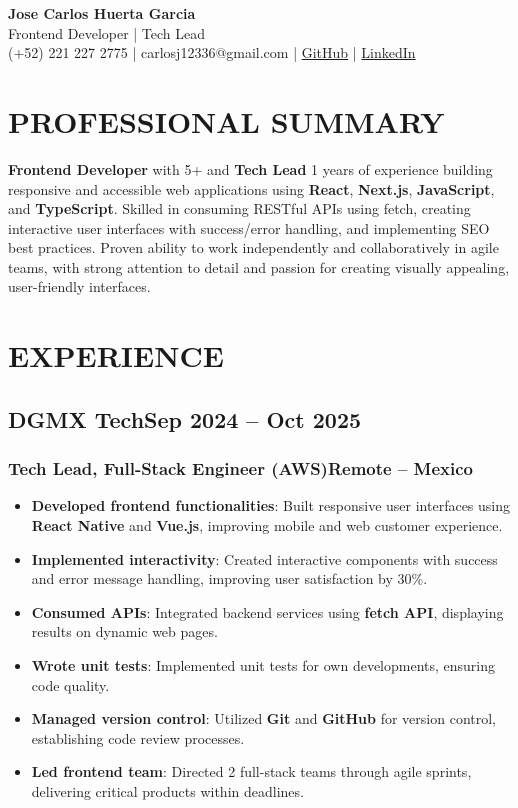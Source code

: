 \documentclass[a4paper,10pt]{article}
\newcommand{\kw}[1]{\textbf{\textcolor{keyword}{#1}}}
\newcommand{\tech}[1]{\textbf{\textcolor{tech}{#1}}}
\begin{document}
\begin{center}
{\bfseries\LARGE Jose Carlos Huerta Garcia} \\
Frontend Developer | Tech Lead \\
(+52) 221 227 2775 | carlosj12336@gmail.com | \href{https://github.com/jcarloshg}{GitHub} | \href{https://www.linkedin.com/in/jose-carlos-huerta-garcia-773952212}{LinkedIn}
\end{center}

\section*{PROFESSIONAL SUMMARY}
\kw{Frontend Developer} with 5+ and \kw{Tech Lead} 1 years of experience building responsive and accessible web applications using \kw{React}, \kw{Next.js}, \kw{JavaScript}, and \kw{TypeScript}. Skilled in consuming RESTful APIs using fetch, creating interactive user interfaces with success/error handling, and implementing SEO best practices. Proven ability to work independently and collaboratively in agile teams, with strong attention to detail and passion for creating visually appealing, user-friendly interfaces.

\section*{EXPERIENCE}

\subsection*{DGMX Tech\hfill\textbf{Sep 2024 -- Oct 2025}}
\subsubsection*{Tech Lead, Full-Stack Engineer (AWS)\hfill Remote -- Mexico}
\begin{itemize}[noitemsep, leftmargin=*]
    \item \textbf{Developed frontend functionalities}: Built responsive user interfaces using \tech{React Native} and \tech{Vue.js}, improving mobile and web customer experience.
    \item \textbf{Implemented interactivity}: Created interactive components with success and error message handling, improving user satisfaction by 30\%.
    \item \textbf{Consumed APIs}: Integrated backend services using \tech{fetch API}, displaying results on dynamic web pages.
    \item \textbf{Wrote unit tests}: Implemented unit tests for own developments, ensuring code quality.
    \item \textbf{Managed version control}: Utilized \tech{Git} and \tech{GitHub} for version control, establishing code review processes.
    \item \textbf{Led frontend team}: Directed 2 full-stack teams through agile sprints, delivering critical products within deadlines.
\end{itemize}
\end{document}
